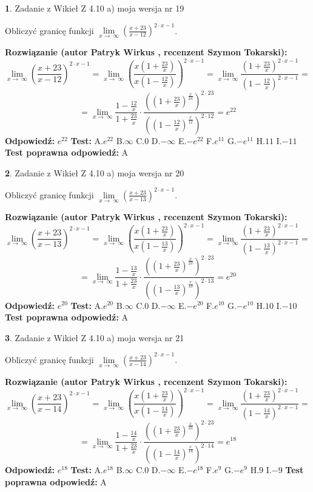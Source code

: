 \documentclass[12pt, a4paper]{article}
\theoremstyle{definition} %
\newtheorem{zad}{}
\newcommand{\zadStart}[1]{\begin{zad}#1\newline}
\newcommand{\zadStop}{\end{zad}}
\newcommand{\rozwStart}[2]{\noindent \textbf{Rozwiązanie (autor #1 , recenzent #2): }\newline}
\newcommand{\rozwStop}{\newline}
\newcommand{\odpStart}{\noindent \textbf{Odpowiedź:}\newline}
\newcommand{\odpStop}{\newline}
\newcommand{\testStart}{\noindent \textbf{Test:}\newline}
\newcommand{\testStop}{\newline}
\newcommand{\kluczStart}{\noindent \textbf{Test poprawna odpowiedź:}\newline}
\newcommand{\kluczStop}{\newline}
\begin{document}
\zadStart{Zadanie z Wikieł Z 4.10 a) moja wersja nr 19}

Obliczyć granicę funkcji  $\lim\limits_{x\to\ \infty}(\frac{x+23}{x-12})^{2\cdot x-1}$.
\zadStop
\rozwStart{Patryk Wirkus}{Szymon Tokarski}
$$\lim\limits_{x\to\ \infty}(\frac{x+23}{x-12})^{2\cdot x-1} = \lim\limits_{x\to\ \infty}(\frac{x(1+\frac{23}{x})}{x(1-\frac{12}{x})})^{2\cdot x-1}=\lim\limits_{x\to\ \infty}\frac{(1+\frac{23}{x})^{2\cdot x-1}}{(1-\frac{12}{x})^{2\cdot x-1}}=$$
$$=\lim\limits_{x\to\ \infty}\frac{1-\frac{12}{x}}{1+\frac{23}{x}}\cdot\frac{((1+\frac{23}{x})^{\frac{x}{23}})^{2\cdot23}}{((1-\frac{12}{x})^{\frac{x}{12}})^{2\cdot12}}=e^{22}$$
\rozwStop
\odpStart
$e^{22}$
\odpStop
\testStart
A.$e^{22}$ B.$\infty$ C.$0$ D.$-\infty$ E.$-e^{22}$
F.$e^{11}$ G.$-e^{11}$
H.$11$
I.$-11$
\testStop
\kluczStart
A
\kluczStop



\zadStart{Zadanie z Wikieł Z 4.10 a) moja wersja nr 20}

Obliczyć granicę funkcji  $\lim\limits_{x\to\ \infty}(\frac{x+23}{x-13})^{2\cdot x-1}$.
\zadStop
\rozwStart{Patryk Wirkus}{Szymon Tokarski}
$$\lim\limits_{x\to\ \infty}(\frac{x+23}{x-13})^{2\cdot x-1} = \lim\limits_{x\to\ \infty}(\frac{x(1+\frac{23}{x})}{x(1-\frac{13}{x})})^{2\cdot x-1}=\lim\limits_{x\to\ \infty}\frac{(1+\frac{23}{x})^{2\cdot x-1}}{(1-\frac{13}{x})^{2\cdot x-1}}=$$
$$=\lim\limits_{x\to\ \infty}\frac{1-\frac{13}{x}}{1+\frac{23}{x}}\cdot\frac{((1+\frac{23}{x})^{\frac{x}{23}})^{2\cdot23}}{((1-\frac{13}{x})^{\frac{x}{13}})^{2\cdot13}}=e^{20}$$
\rozwStop
\odpStart
$e^{20}$
\odpStop
\testStart
A.$e^{20}$ B.$\infty$ C.$0$ D.$-\infty$ E.$-e^{20}$
F.$e^{10}$ G.$-e^{10}$
H.$10$
I.$-10$
\testStop
\kluczStart
A
\kluczStop



\zadStart{Zadanie z Wikieł Z 4.10 a) moja wersja nr 21}

Obliczyć granicę funkcji  $\lim\limits_{x\to\ \infty}(\frac{x+23}{x-14})^{2\cdot x-1}$.
\zadStop
\rozwStart{Patryk Wirkus}{Szymon Tokarski}
$$\lim\limits_{x\to\ \infty}(\frac{x+23}{x-14})^{2\cdot x-1} = \lim\limits_{x\to\ \infty}(\frac{x(1+\frac{23}{x})}{x(1-\frac{14}{x})})^{2\cdot x-1}=\lim\limits_{x\to\ \infty}\frac{(1+\frac{23}{x})^{2\cdot x-1}}{(1-\frac{14}{x})^{2\cdot x-1}}=$$
$$=\lim\limits_{x\to\ \infty}\frac{1-\frac{14}{x}}{1+\frac{23}{x}}\cdot\frac{((1+\frac{23}{x})^{\frac{x}{23}})^{2\cdot23}}{((1-\frac{14}{x})^{\frac{x}{14}})^{2\cdot14}}=e^{18}$$
\rozwStop
\odpStart
$e^{18}$
\odpStop
\testStart
A.$e^{18}$ B.$\infty$ C.$0$ D.$-\infty$ E.$-e^{18}$
F.$e^{9}$ G.$-e^{9}$
H.$9$
I.$-9$
\testStop
\kluczStart
A
\kluczStop
\end{document}
